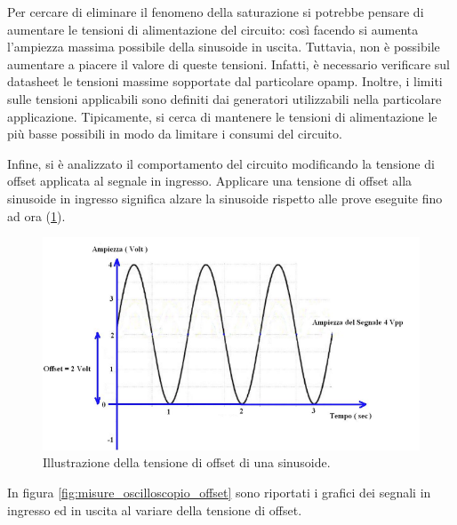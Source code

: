 \noindent
Per cercare di eliminare il fenomeno della saturazione si potrebbe pensare di aumentare le tensioni di alimentazione del circuito: così facendo si aumenta l'ampiezza massima possibile della sinusoide in uscita. Tuttavia, non è possibile aumentare a piacere il valore di queste tensioni. Infatti, è necessario verificare sul datasheet le tensioni massime sopportate dal particolare opamp. Inoltre, i limiti sulle tensioni applicabili sono definiti dai generatori utilizzabili nella particolare applicazione. Tipicamente, si cerca di mantenere le tensioni di alimentazione le più basse possibili in modo da limitare i consumi del circuito.


Infine, si è analizzato il comportamento del circuito modificando la tensione di offset applicata al segnale in ingresso. Applicare una tensione di offset alla sinusoide in ingresso significa alzare la sinusoide rispetto alle prove eseguite fino ad ora (\Fig\ref{fig:misure_oscilloscopio_offset_sinusoide}).
\begin{figure}[h!]
	\centering
	\includegraphics[width=0.6\linewidth]{./ImageFiles/Laboratorio 1/tensione offset}
	\caption{Illustrazione della tensione di offset di una sinusoide.}
	\label{fig:misure_oscilloscopio_offset_sinusoide}
\end{figure} 

\noindent
In figura \ref{fig:misure_oscilloscopio_offset} sono riportati i grafici dei segnali in ingresso ed in uscita al variare della tensione di offset.

